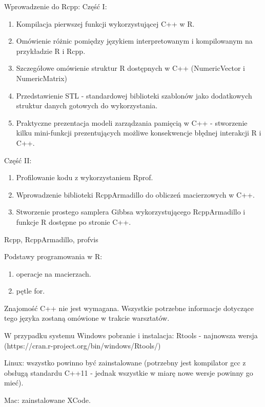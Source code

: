 \documentclass[\main/boa.tex]{subfiles}
\begin{document}
\planwarsztatu 
Wprowadzenie do Rcpp: Część I:
\begin{enumerate}
\item Kompilacja pierwszej funkcji wykorzystującej C++ w R.
\item Omówienie różnic pomiędzy językiem interpretowanym i kompilowanym na przykładzie R i Rcpp.
\item Szczegółowe omówienie struktur R dostępnych w C++ (NumericVector i NumericMatrix)
\item Przedstawienie STL - standardowej biblioteki szablonów jako dodatkowych struktur danych gotowych do wykorzystania.
\item Praktyczne prezentacja modeli zarządzania pamięcią w C++ - stworzenie kilku mini-funkcji prezentujących możliwe konsekwencje błędnej interakcji R i C++.
\end{enumerate}	 
Część II:
\begin{enumerate}
\item Profilowanie kodu z wykorzystaniem Rprof.
\item Wprowadzenie biblioteki RcppArmadillo do obliczeń macierzowych w C++.
\item Stworzenie prostego samplera Gibbsa wykorzystującego RcppArmadillo i funkcje R dostępne po stronie C++.
\end{enumerate}

\pakiety Rcpp, RcppArmadillo, profvis

\umiejetnosci Podstawy programowania w R:
\begin{enumerate}
	\item operacje na macierzach.
	\item pętle for.
\end{enumerate}
Znajomość C++ nie jest wymagana. Wszystkie potrzebne informacje dotyczące tego języka zostaną omówione w trakcie warsztatów.

\wymagania W przypadku systemu Windows pobranie i instalacja: Rtools - najnowsza wersja (https://cran.r-project.org/bin/windows/Rtools/)

Linux: wszystko powinno być zainstalowane (potrzebny jest kompilator gcc z obsługą standardu C++11 - jednak wszystkie w miarę nowe wersje powinny go mieć).

Mac: zainstalowane XCode.
\end{document}
